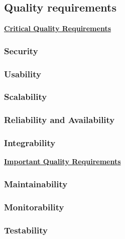\documentclass[a4paper,12pt,titlepage]{article}
\begin{document}
 	\subsection{Quality requirements}
 	\newpage
		\underline{\textbf{Critical Quality Requirements}}
		\subsubsection{Security}
			
			
		\subsubsection{Usability}
			
			
		\subsubsection{Scalability}
			
			
		\subsubsection{Reliability and Availability}
			
			
		\subsubsection{Integrability}
			
		\underline{\textbf{Important Quality Requirements}}
			
		\subsubsection{Maintainability}
			
			
		\subsubsection{Monitorability}
			
			
		\subsubsection{Testability}
			
			
\end{document}

